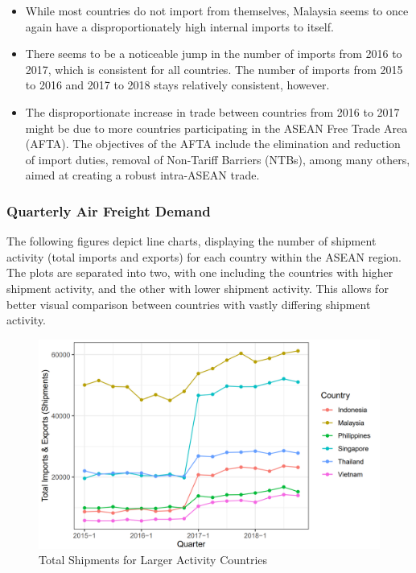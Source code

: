 \documentclass{article}
\begin{document}
\begin{itemize}
    \item While most countries do not import from themselves, Malaysia seems to once again have a disproportionately high internal imports to itself. 
    \item There seems to be a noticeable jump in the number of imports from 2016 to 2017, which is consistent for all countries. The number of imports from 2015 to 2016 and 2017 to 2018 stays relatively consistent, however.
    \item The disproportionate increase in trade between countries from 2016 to 2017 might be due to more countries participating in the ASEAN Free Trade Area (AFTA). The objectives of the AFTA include the elimination and reduction of import duties, removal of Non-Tariff Barriers (NTBs), among many others, aimed at creating a robust intra-ASEAN trade.
\end{itemize}

\newpage

\subsubsection{Quarterly Air Freight Demand}
The following figures depict line charts, displaying the number of shipment activity (total imports and exports) for each country within the ASEAN region. The plots are separated into two, with one including the countries with higher shipment activity, and the other with lower shipment activity. This allows for better visual comparison between countries with vastly differing shipment activity. 

\begin{figure}[H]
\centering
\includegraphics[width=1\textwidth]{images/Line Plots/ASEAN/ASEAN_Large_Quarterly_Shipments_BigFont.png}
\caption{\label{fig2}Total Shipments for Larger Activity Countries}
\end{figure}
\end{document}
